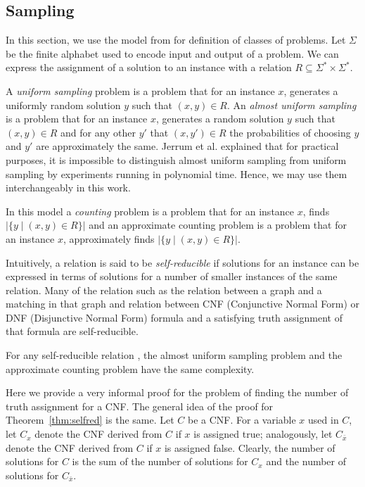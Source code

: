 \subsection*{Sampling}
In this section, we use the model from \cite{JVV} for definition of classes of problems.
Let \(\Sigma\) be the finite alphabet used to encode input and output of a problem. 
We can express the assignment of a solution to an instance with a relation 
\(R \subseteq \Sigma^* \times \Sigma^*\)\@.

A \emph{uniform sampling} problem is a problem that for an instance \(x\),
generates a uniformly random solution \(y\) such that \((x,y) \in R\)\@.
An \emph{almost uniform sampling} is a problem that for an instance \(x\),
generates a random solution \(y\) 
such that \((x,y) \in R\) and for any other \(y'\) that \((x,y')\in R\) the 
probabilities of choosing \(y\) and \(y'\) are approximately the same.
Jerrum et al. \cite{JVV} explained that for practical purposes, it is impossible to distinguish
almost uniform sampling from uniform sampling by experiments running in polynomial time.
Hence, we may use them interchangeably in this work.

In this model a \emph{counting} problem is a problem that for an instance \(x\),
finds \(|\{y \mid (x,y) \in R\}|\) and an approximate counting
problem is a problem that for an instance \(x\), approximately 
finds \(|\{y \mid (x,y) \in R\}|\)\@.

Intuitively, a relation is said to be \emph{self-reducible} if solutions for an instance can be
expressed in terms of solutions for a number of smaller instances of the same relation.
Many of the relation such as the relation between a graph and a matching in that graph
and relation between CNF (Conjunctive Normal Form) or DNF (Disjunctive Normal Form) formula and
a satisfying truth assignment of that formula are self-reducible.

\begin{theorem}  \label{thm:selfred}
For any self-reducible relation \mR, the almost uniform sampling problem and the approximate counting
problem have the same complexity.
\end{theorem}

Here we provide a very informal 
proof for the problem of finding the number of truth assignment for a CNF\@.
The general idea of the proof for Theorem~\ref{thm:selfred} is the same.
Let \(C\) be a CNF\@.
For a variable \(x\) used in \(C\), let \(C_x\) denote 
the CNF derived from \(C\) if \(x\) is assigned true; analogously, let \(C_{\bar x}\) denote
the CNF derived from \(C\) if \(x\) is assigned false. Clearly, the number of solutions for
\(C\) is the sum of the number of solutions for \(C_x\) and the number of solutions 
for \(C_{\bar x}\)\@.

